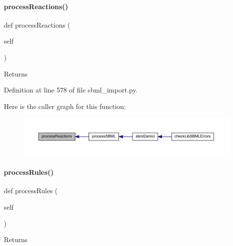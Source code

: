 \paragraph{\texorpdfstring{process\+Reactions()}{processReactions()}}
{\footnotesize\ttfamily def process\+Reactions (\begin{DoxyParamCaption}\item[{}]{self }\end{DoxyParamCaption})}

\begin{DoxyReturn}{Returns}

\end{DoxyReturn}


Definition at line 578 of file sbml\+\_\+import.\+py.

Here is the caller graph for this function\+:
\nopagebreak
\begin{figure}[H]
\begin{center}
\leavevmode
\includegraphics[width=350pt]{classamici_1_1sbml__import_1_1_sbml_importer_adbdd8e9af99679633109829d94b3fd3e_icgraph}
\end{center}
\end{figure}
\mbox{\label{classamici_1_1sbml__import_1_1_sbml_importer_a7df6b4ae4e3e757bc8de5e0cc54fe16b}} 
\paragraph{\texorpdfstring{process\+Rules()}{processRules()}}
{\footnotesize\ttfamily def process\+Rules (\begin{DoxyParamCaption}\item[{}]{self }\end{DoxyParamCaption})}

\begin{DoxyReturn}{Returns}

\end{DoxyReturn}


